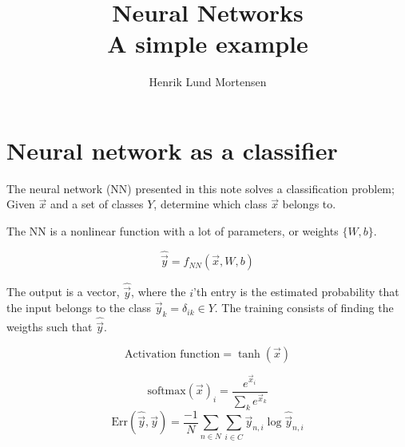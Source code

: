\documentclass[oneside]{memoir}
\title{Neural Networks \\ \small{A simple example}}
\author{Henrik Lund Mortensen}
\newcommand{\yhat}{\ensuremath{\hat{\vec{y}}}}
\begin{document}
\maketitle


\section{Neural network as a classifier}
The neural network (NN) presented in this note solves a classification problem; Given $\vec{x}$ and a set of classes $Y$, determine which class $\vec{x}$ belongs to. 

The NN is a nonlinear function with a lot of parameters, or weights $\{W,b\}$.

\begin{equation}
  \label{NN}
\yhat{} = f_{NN}(\vec{x},W,b)
\end{equation}

The output is a vector, $\hat{\vec{y}}$, where the $i$'th entry is the estimated probability that the input belongs to the class $\vec{y}_{k} = \delta_{ik} \in Y$. The training consists of finding the weigths such that $\yhat{}$. 











\begin{equation}
  \label{activation function tanh}
\text{Activation function} = \tanh(\vec{x})
\end{equation}

\begin{equation}
  \label{softmax}
  \text{softmax}(\vec{x})_i = \frac{e^{\vec{x}_i}}{\sum_k e^{\vec{x}_k}}
\end{equation}
\begin{equation}
  \label{cross entropy}
  \text{Err}(\hat{\vec{y}},\vec{y}) = \frac{-1}{N} \sum_{n\in N} \sum_{i \in C} \vec{y}_{n,i} \log \hat{\vec{y}}_{n,i}
\end{equation}
\end{document}
